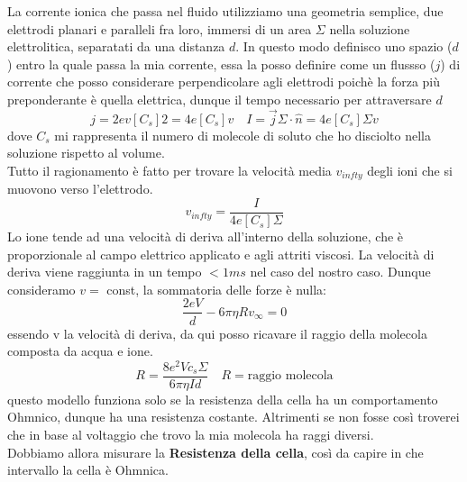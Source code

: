 \documentclass{article}
\begin{document}
La corrente ionica che passa nel fluido utilizziamo una geometria semplice, due elettrodi planari e paralleli fra loro,
immersi di un area $\Sigma$ nella soluzione elettrolitica, separatati da una distanza $d$. 
In questo modo definisco uno spazio ($d$) entro la quale passa la mia corrente, essa la posso definire come un flussso ($j$) di
corrente che posso considerare perpendicolare agli elettrodi poichè 
la forza più preponderante è quella elettrica, dunque il tempo necessario per attraversare $d$
\[
j=2ev[C_s]2=4e[C_s]v \quad I= \vec{j} \Sigma \cdot \hat{n}= 4e[C_s]\Sigma v
\]
dove $C_s$ mi rappresenta il numero di molecole di soluto che ho disciolto nella soluzione rispetto al volume. \\
Tutto il ragionamento è fatto per trovare la velocità media $v_{infty}$ degli ioni che si muovono verso l'elettrodo.
\[
v_{infty}=\frac{I}{4e[C_s]\Sigma} 
\]
Lo ione tende ad una velocità di deriva all'interno della soluzione, che è proporzionale al campo elettrico applicato e agli attriti viscosi. 
La velocità di deriva viene raggiunta in un tempo $< 1ms $ nel caso del nostro caso. Dunque consideramo $v =$ const, la sommatoria delle forze
è nulla:
\[
\frac{2eV}{d} - 6 \pi \eta R v_{\infty} =0
\]
essendo v la velocità di deriva, da qui posso ricavare il raggio della molecola composta da acqua e ione.
\[
R= \frac{8 e^2 V c_{s} \Sigma}{6 \pi \eta I d} \quad R= \text{raggio molecola}
\]
questo modello funziona solo se la resistenza della cella ha un comportamento Ohmnico, dunque ha una resistenza costante. 
Altrimenti se non fosse così troverei che in base al voltaggio che trovo la mia molecola ha raggi diversi. \\
Dobbiamo allora misurare la \textbf{Resistenza della cella}, così da capire in che intervallo la cella è Ohmnica. 
\end{document}

